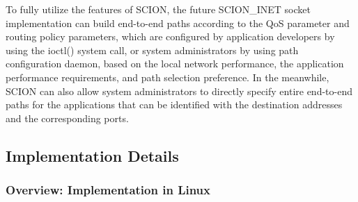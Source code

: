 To fully utilize the features of SCION, the future SCION\_INET
socket implementation can build end-to-end paths according to the
QoS parameter and routing policy parameters, which are configured by
application developers by using the ioctl() system call, or system
administrators by using path configuration daemon, based on the
local network performance, the application performance requirements,
and path selection preference. In the meanwhile, SCION can also
allow system administrators to directly specify entire end-to-end
paths for the applications that can be identified with the
destination addresses and the corresponding ports.






\subsection{Implementation Details}

\subsubsection{Overview: Implementation in Linux}

